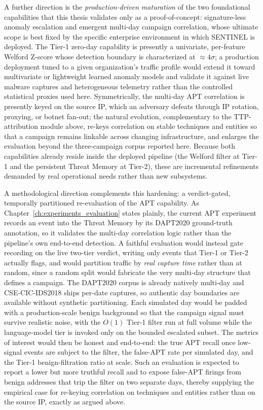 A further direction is the \emph{production-driven maturation} of the two foundational capabilities that this thesis validates only as a proof-of-concept: signature-less anomaly escalation and emergent multi-day campaign correlation, whose ultimate scope is best fixed by the specific enterprise environment in which SENTINEL is deployed. The Tier-1 zero-day capability is presently a univariate, per-feature Welford Z-score whose detection boundary is characterized at $\approx 4\sigma$; a production deployment tuned to a given organization's traffic profile would extend it toward multivariate or lightweight learned anomaly models and validate it against live malware captures and heterogeneous telemetry rather than the controlled statistical proxies used here. Symmetrically, the multi-day APT correlation is presently keyed on the source IP, which an adversary defeats through IP rotation, proxying, or botnet fan-out; the natural evolution, complementary to the TTP-attribution module above, re-keys correlation on stable techniques and entities so that a campaign remains linkable across changing infrastructure, and enlarges the evaluation beyond the three-campaign corpus reported here. Because both capabilities already reside inside the deployed pipeline (the Welford filter at Tier-1 and the persistent Threat Memory at Tier-2), these are incremental refinements demanded by real operational needs rather than new subsystems.

A methodological direction complements this hardening: a verdict-gated, temporally partitioned re-evaluation of the APT capability. As Chapter~\ref{ch:experiments_evaluation} states plainly, the current APT experiment records an event into the Threat Memory by its DAPT2020 ground-truth annotation, so it validates the multi-day correlation logic rather than the pipeline's own end-to-end detection. A faithful evaluation would instead gate recording on the live two-tier verdict, writing only events that Tier-1 or Tier-2 actually flags, and would partition traffic by \emph{real capture time} rather than at random, since a random split would fabricate the very multi-day structure that defines a campaign. The DAPT2020 corpus is already natively multi-day and CSE-CIC-IDS2018 ships per-date captures, so authentic day boundaries are available without synthetic partitioning. Each simulated day would be padded with a production-scale benign background so that the campaign signal must survive realistic noise, with the $O(1)$ Tier-1 filter run at full volume while the language-model tier is invoked only on the bounded escalated subset. The metrics of interest would then be honest and end-to-end: the true APT recall once low-signal events are subject to the filter, the false-APT rate per simulated day, and the Tier-1 benign-filtration ratio at scale. Such an evaluation is expected to report a lower but more truthful recall and to expose false-APT firings from benign addresses that trip the filter on two separate days, thereby supplying the empirical case for re-keying correlation on techniques and entities rather than on the source IP, exactly as argued above.

